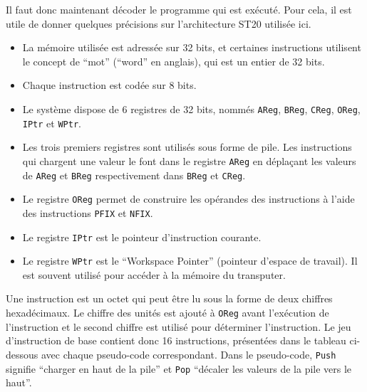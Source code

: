\documentclass[a4paper,10pt]{article}
\begin{document}
Il faut donc maintenant décoder le programme qui est exécuté.
Pour cela, il est utile de donner quelques précisions sur l'architecture ST20 utilisée ici.
\begin{itemize}
  \item La mémoire utilisée est adressée sur 32 bits, et certaines instructions utilisent le concept de ``mot'' (``word'' en anglais), qui est un entier de 32 bits.
  \item Chaque instruction est codée sur 8 bits.
  \item Le système dispose de 6 registres de 32 bits, nommés \texttt{AReg}, \texttt{BReg}, \texttt{CReg}, \texttt{OReg}, \texttt{IPtr} et \texttt{WPtr}.
  \item Les trois premiers registres sont utilisés sous forme de pile. Les instructions qui chargent une valeur le font dans le registre \texttt{AReg} en déplaçant les valeurs de \texttt{AReg} et \texttt{BReg} respectivement dans \texttt{BReg} et \texttt{CReg}.
  \item Le registre \texttt{OReg} permet de construire les opérandes des instructions à l'aide des instructions \texttt{PFIX} et \texttt{NFIX}.
  \item Le registre \texttt{IPtr} est le pointeur d'instruction courante.
  \item Le registre \texttt{WPtr} est le ``Workspace Pointer'' (pointeur d'espace de travail). Il est souvent utilisé pour accéder à la mémoire du transputer.
\end{itemize}

Une instruction est un octet qui peut être lu sous la forme de deux chiffres hexadécimaux.
Le chiffre des unités est ajouté à \texttt{OReg} avant l'exécution de l'instruction et le second chiffre est utilisé pour déterminer l'instruction. Le jeu d'instruction de base contient donc 16 instructions, présentées dans le tableau ci-dessous avec chaque pseudo-code correspondant.
Dans le pseudo-code, \texttt{Push} signifie ``charger en haut de la pile'' et \texttt{Pop} ``décaler les valeurs de la pile vers le haut''.
\end{document}
